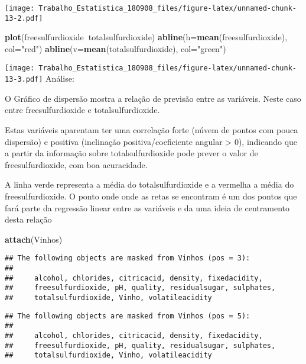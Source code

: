 \documentclass[]{article}
\newenvironment{Shaded}{\begin{snugshade}}{\end{snugshade}}
\newcommand{\KeywordTok}[1]{\textcolor[rgb]{0.13,0.29,0.53}{\textbf{#1}}}
\newcommand{\DataTypeTok}[1]{\textcolor[rgb]{0.13,0.29,0.53}{#1}}
\newcommand{\StringTok}[1]{\textcolor[rgb]{0.31,0.60,0.02}{#1}}
\newcommand{\OperatorTok}[1]{\textcolor[rgb]{0.81,0.36,0.00}{\textbf{#1}}}
\newcommand{\NormalTok}[1]{#1}
\begin{document}
\texttt{[image: Trabalho\_Estatistica\_180908\_files/figure-latex/unnamed-chunk-13-2.pdf]}

\begin{Shaded}
\begin{Highlighting}[]
\KeywordTok{plot}\NormalTok{(freesulfurdioxide}\OperatorTok{~}\NormalTok{totalsulfurdioxide)}
\KeywordTok{abline}\NormalTok{(}\DataTypeTok{h=}\KeywordTok{mean}\NormalTok{(freesulfurdioxide), }\DataTypeTok{col=}\StringTok{"red"}\NormalTok{)}
\KeywordTok{abline}\NormalTok{(}\DataTypeTok{v=}\KeywordTok{mean}\NormalTok{(totalsulfurdioxide), }\DataTypeTok{col=}\StringTok{"green"}\NormalTok{)}
\end{Highlighting}
\end{Shaded}

\texttt{[image: Trabalho\_Estatistica\_180908\_files/figure-latex/unnamed-chunk-13-3.pdf]}
Análise:

O Gráfico de dispersão mostra a relação de previsão entre as variáveis.
Neste caso entre freesulfurdioxide e totalsulfurdioxide.

Estas variáveis aparentam ter uma correlação forte (núvem de pontos com
pouca dispersão) e positiva (inclinação positiva/coeficiente angular
\textgreater{} 0), indicando que a partir da informação sobre
totalsulfurdioxide pode prever o valor de freesulfurdioxide, com boa
acuracidade.

A linha verde representa a média do totalsulfurdioxide e a vermelha a
média do freesulfurdioxide. O ponto onde onde as retas se encontram é um
dos pontos que fará parte da regressão linear entre as variáveis e da
uma ideia de centramento desta relação

\begin{Shaded}
\begin{Highlighting}[]
\KeywordTok{attach}\NormalTok{(Vinhos)}
\end{Highlighting}
\end{Shaded}

\begin{verbatim}
## The following objects are masked from Vinhos (pos = 3):
## 
##     alcohol, chlorides, citricacid, density, fixedacidity,
##     freesulfurdioxide, pH, quality, residualsugar, sulphates,
##     totalsulfurdioxide, Vinho, volatileacidity
\end{verbatim}

\begin{verbatim}
## The following objects are masked from Vinhos (pos = 5):
## 
##     alcohol, chlorides, citricacid, density, fixedacidity,
##     freesulfurdioxide, pH, quality, residualsugar, sulphates,
##     totalsulfurdioxide, Vinho, volatileacidity
\end{verbatim}
\end{document}
